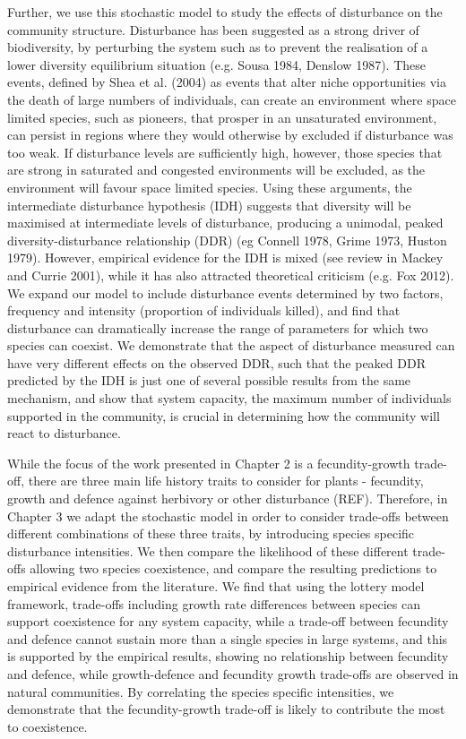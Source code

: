Further, we use this stochastic model to study the effects of disturbance on the community structure. Disturbance has been suggested as a strong driver of biodiversity, by perturbing the system such as to prevent the realisation of a lower diversity equilibrium situation (e.g. Sousa 1984, Denslow 1987). These events, defined by Shea et al. (2004) as events that alter niche opportunities via the death of large numbers of individuals, can create an environment where space limited species, such as pioneers, that prosper in an unsaturated environment, can persist in regions where they would otherwise by excluded if disturbance was too weak. If disturbance levels are sufficiently high, however, those species that are strong in saturated and congested environments will be excluded, as the environment will favour space limited species. Using these arguments, the intermediate disturbance hypothesis (IDH) suggests that diversity will be maximised at intermediate levels of disturbance, producing a unimodal, peaked diversity-disturbance relationship (DDR) (eg Connell 1978, Grime 1973, Huston 1979). However, empirical evidence for the IDH is mixed (see review in Mackey and Currie 2001), while it has also attracted theoretical criticism (e.g. Fox 2012). We expand our model to include disturbance events determined by two factors, frequency and intensity (proportion of individuals killed), and find that disturbance can dramatically increase the range of parameters for which two species can coexist. We demonstrate that the aspect of disturbance measured can have very different effects on the observed DDR, such that the peaked DDR predicted by the IDH is just one of several possible results from the same mechanism, and show that system capacity, the maximum number of individuals supported in the community, is crucial in determining how the community will react to disturbance.

While the focus of the work presented in Chapter 2 is a fecundity-growth trade-off, there are three main life history traits to consider for plants - fecundity, growth and defence against herbivory or other disturbance (REF). Therefore, in Chapter 3 we adapt the stochastic model in order to consider trade-offs between different combinations of these three traits, by introducing species specific disturbance intensities. We then compare the likelihood of these different trade-offs allowing two species coexistence, and compare the resulting predictions to empirical evidence from the literature. We find that using the lottery model framework, trade-offs including growth rate differences between species can support coexistence for any system capacity, while a trade-off between fecundity and defence cannot sustain more than a single species in large systems, and this is supported by the empirical results, showing no relationship between fecundity and defence, while growth-defence and fecundity growth trade-offs are observed in natural communities. By correlating the species specific intensities, we demonstrate that the fecundity-growth trade-off is likely to contribute the most to coexistence.

